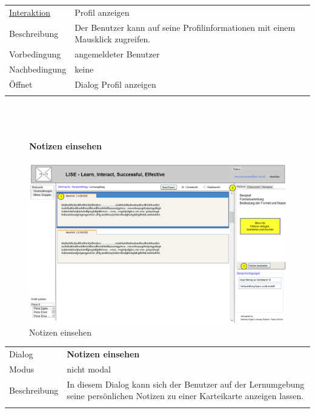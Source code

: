\documentclass[12pt,a4paper]{article}
\begin{document}
{\begin{tabular}{l p{12cm}}
\end{tabular} \\\\

\begin{tabular}{l p{12cm}}
\underline{Interaktion}  	 & Profil anzeigen\\ 
Beschreibung   	 & Der Benutzer kann auf seine Profilinformationen mit einem Mausklick zugreifen. \\
Vorbedingung	 & angemeldeter Benutzer\\
Nachbedingung	 & keine \\
Öffnet			 & \glqq Dialog Profil anzeigen\grqq \\\\
\end{tabular}\\\\

\begin{figure}[H]
	\centering
	\paragraph{Notizen einsehen}
	\includegraphics[width=\textwidth]{Bilder/Mockups/GUI/NotizAendernAnsicht[Benutzer].png}
	\caption{Notizen einsehen}
	\label{GuiNotizenEinsehen}
\end{figure}
\begin{tabular}{l p{12cm}}
Dialog 	 & \textbf{Notizen einsehen} \\ 
Modus & nicht modal\\ 
Beschreibung   	 & In diesem Dialog kann sich der Benutzer auf der Lernumgebung seine persönlichen Notizen zu einer Karteikarte anzeigen lassen. \\\\


\end{tabular}}
\end{document}
